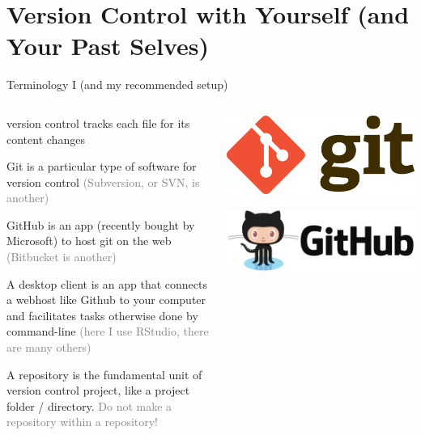\documentclass[ignorenonframetext, 10pt, aspectratio=169]{beamer}
\begin{document}
\section{Version Control with Yourself (and Your Past Selves)}

\begin{frame}{Terminology I (and my recommended setup)}
\begin{columns}[T]
\begin{column}{0.6\textwidth}
\begin{wideitemize}
\item<1-> version control \alert{tracks} each file for its content changes
\item<2-> \alert{Git} is a particular type of software for version control \textcolor{gray}{(Subversion, or SVN, is another)}
\item<3-> \alert{GitHub} is an app (recently bought by Microsoft) to host git on the web \textcolor{gray}{(Bitbucket is another)}
\item<4-> A \alert{desktop client} is an app that connects a webhost like Github to your computer and facilitates tasks otherwise done by \alert{command-line} \textcolor{gray}{(here I use \alert{RStudio}, there are many others)}
\item<5-> A \alert{repository} is the fundamental unit of version control project, like a project folder / directory. \textcolor{gray}{Do not make a repository within a repository!}
\end{wideitemize}
\end{column}
\begin{column}{0.4\textwidth}
\vspace{1cm}
\centering
{}\includegraphics[width = 0.6\linewidth]{Git-Logo-2Color.png}

\bigskip
{}\includegraphics[width = 0.6\linewidth]{github-logo-1.png}


\end{column}
\end{columns}
\end{frame}
\end{document}
